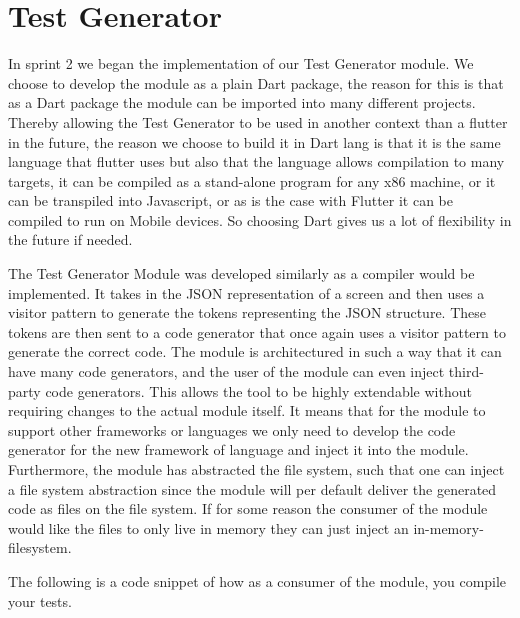\section{Test Generator}
In sprint 2 we began the implementation of our Test Generator module. 
We choose to develop the module as a plain Dart package, the reason for this is that as a Dart package the module can be imported into many different projects.
Thereby allowing the Test Generator to be used in another context than a flutter in the future, the reason we choose to build it in Dart lang is that it is the same language that flutter uses but also that the language allows compilation to many targets, it can be compiled as a stand-alone program for any x86 machine, or it can be transpiled into Javascript, or as is the case with Flutter it can be compiled to run on Mobile devices. 
So choosing Dart gives us a lot of flexibility in the future if needed.

The Test Generator Module was developed similarly as a compiler would be implemented.
It takes in the JSON representation of a screen and then uses a visitor pattern to generate the tokens representing the JSON structure.
These tokens are then sent to a code generator that once again uses a visitor pattern to generate the correct code.
The module is architectured in such a way that it can have many code generators, and the user of the module can even inject third-party code generators.
This allows the tool to be highly extendable without requiring changes to the actual module itself.
It means that for the module to support other frameworks or languages we only need to develop the code generator for the new framework of language and inject it into the module.
Furthermore, the module has abstracted the file system, such that one can inject a file system abstraction since the module will per default deliver the generated code as files on the file system. If for some reason the consumer of the module would like the files to only live in memory they can just inject an in-memory-filesystem.

The following is a code snippet of how as a consumer of the module, you compile your tests.

